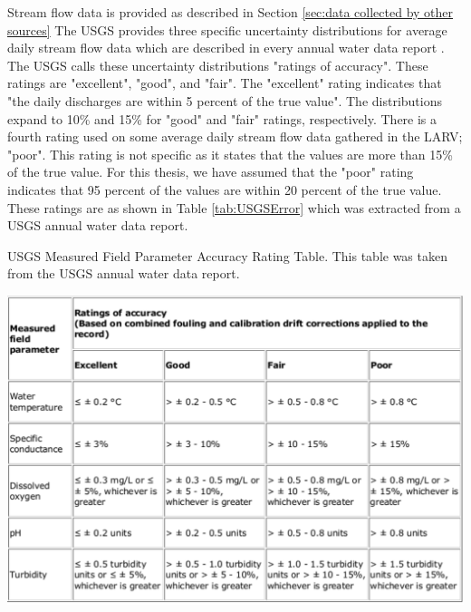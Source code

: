 \begin{linenumbers}
Stream flow data is provided as described in Section \ref{sec:data collected by other sources}  The USGS provides three specific uncertainty distributions for average daily stream flow data which are described in every annual water data report \parencite{USGS2006NWIS, USGS2007NWIS, USGS2008NWIS, USGS2009NWIS, USGS2010NWIS, USGS2011NWIS, USGS2012NWIS}.  The USGS calls these uncertainty distributions "ratings of accuracy".  These ratings are "excellent", "good", and "fair".  The "excellent" rating indicates that "the daily discharges are within 5 percent of the true value".  The distributions expand to 10\% and 15\% for "good" and "fair" ratings, respectively.  There is a fourth rating used on some average daily stream flow data gathered in the LARV; "poor".  This rating is not specific as it states that the values are more than 15\% of the true value.  For this thesis, we have assumed that the "poor" rating indicates that 95 percent of the values are within 20 percent of the true value.  These ratings are as shown in Table \ref{tab:USGSError} which was extracted from a USGS annual water data report.

\begin{table}[htbp]
	\caption[USGS Measured Field Parameter Accuracy Rating Table.]{USGS Measured Field Parameter Accuracy Rating Table.  This table was taken from the USGS annual water data report. }
	\label{tab:USGSError}
	\includegraphics[width=6in]{"Figures/USGS_error_table"}
\end{table}






\end{linenumbers}
